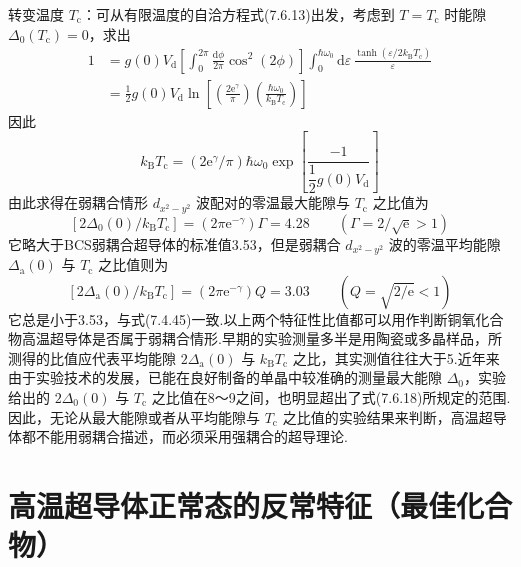 转变温度 $T_{\mathrm{c}}$：可从有限温度的自洽方程式(7.6.13)出发，考虑到 $T=T_{\mathrm{c}}$ 时能隙 $\Delta_{0}\left(T_{\mathrm{c}}\right)=0$，求出
\begin{equation*}
\begin{aligned}
  1&=g(0)V_{\mathrm{d}}\left[\int_{0}^{2\pi}\frac{\mathrm{d}\phi}{2\pi}\cos^{2}(2\phi)\right]
  \int_{0}^{\hbar\omega_{0}}\mathrm{d}\varepsilon\,\frac{\tanh\left(\varepsilon/2k_{\mathrm{B}}T_{\mathrm{c}}\right)}{\varepsilon}\\
  &=\frac{1}{2}g(0)V_{\mathrm{d}}\ln\left[\left(\frac{2\mathrm{e}^{\gamma}}{\pi}\right)\left(\frac{\hbar\omega_{0}}{k_{\mathrm{B}}T_{\mathrm{c}}}\right)\right]
\end{aligned}
\end{equation*}
因此
\begin{equation}
  k_{\mathrm{B}}T_{\mathrm{c}}=\left(2\mathrm{e}^{\gamma}/\pi\right)\hbar\omega_{0}\exp\left[\frac{-1}{\dfrac{1}{2}g(0)V_{\mathrm{d}}}\right]
\end{equation}
由此求得在弱耦合情形 $d_{x^{2}-y^{2}}$ 波配对的零温最大能隙与 $T_{\mathrm{c}}$ 之比值为
\begin{equation}
  \left[2\Delta_{0}(0)/k_{\mathrm{B}}T_{\mathrm{c}}\right]=\left(2\pi\mathrm{e}^{-\gamma}\right)\Gamma=4.28
  \qquad\left(\Gamma=2/\sqrt{\mathrm{e}}>1\right)
\end{equation}
它略大于BCS弱耦合超导体的标准值3.53，但是弱耦合 $d_{x^{2}-y^{2}}$ 波的零温平均能隙 $\Delta_{\mathrm{a}}(0)$ 与 $T_{\mathrm{c}}$ 之比值则为
\begin{equation}
  \left[2\Delta_{\mathrm{a}}(0)/k_{\mathrm{B}}T_{\mathrm{c}}\right]=\left(2\pi\mathrm{e}^{-\gamma}\right)Q=3.03
  \qquad\left(Q=\sqrt{2/\mathrm{e}}<1\right)
\end{equation}
它总是小于3.53，与式(7.4.45)一致.以上两个特征性比值都可以用作判断铜氧化合物高温超导体是否属于弱耦合情形.早期的实验测量多半是用陶瓷或多晶样品，所测得的比值应代表平均能隙 $2\Delta_{\mathrm{a}}(0)$ 与 $k_{\mathrm{B}}T_{\mathrm{c}}$ 之比，其实测值往往大于5.近年来由于实验技术的发展，已能在良好制备的单晶中较准确的测量最大能隙 $\Delta_{0}$，实验给出的 $2\Delta_{0}(0)$ 与 $T_{\mathrm{c}}$ 之比值在8～9之间，也明显超出了式(7.6.18)所规定的范围.因此，无论从最大能隙或者从平均能隙与 $T_{\mathrm{c}}$ 之比值的实验结果来判断，高温超导体都不能用弱耦合描述，而必须采用强耦合的超导理论.

\section{高温超导体正常态的反常特征（最佳化合物）}

